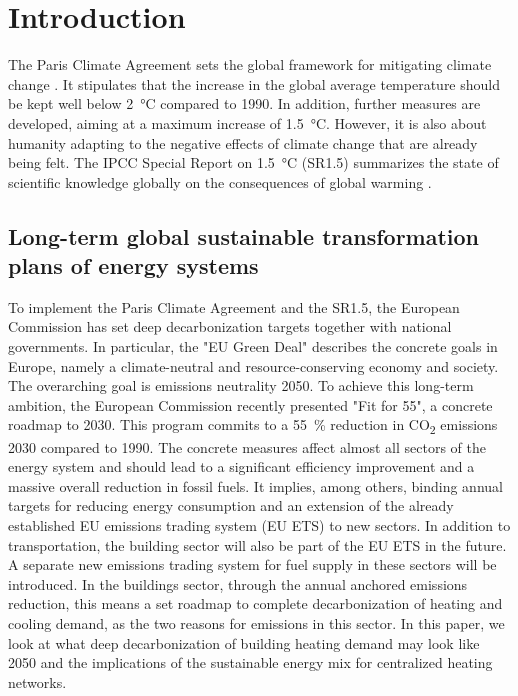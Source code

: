 \section{Introduction}
The Paris Climate Agreement sets the global framework for mitigating climate change \cite{agreement2015paris}. It stipulates that the increase in the global average temperature should be kept well below \SI{2}{\degreeCelsius} compared to 1990. In addition, further measures are developed, aiming at a maximum increase of \SI{1.5}{\degreeCelsius}. However, it is also about humanity adapting to the negative effects of climate change that are already being felt. The IPCC Special Report on \SI{1.5}{\degreeCelsius} (SR1.5) summarizes the state of scientific knowledge globally on the consequences of global warming \cite{edenhofer2011ipcc}.

\subsection{Long-term global sustainable transformation plans of energy systems}
To implement the Paris Climate Agreement and the SR1.5, the European Commission has set deep decarbonization targets together with national governments. In particular, the "EU Green Deal" describes the concrete goals in Europe, namely a climate-neutral and resource-conserving economy and society. The overarching goal is emissions neutrality 2050. To achieve this long-term ambition, the European Commission recently presented "Fit for 55", a concrete roadmap to 2030. This program commits to a \SI{55}{\%} reduction in CO\textsubscript{2} emissions 2030 compared to 1990. The concrete measures affect almost all sectors of the energy system and should lead to a significant efficiency improvement and a massive overall reduction in fossil fuels. It implies, among others, binding annual targets for reducing energy consumption and an extension of the already established EU emissions trading system (EU ETS) to new sectors. In addition to transportation, the building sector will also be part of the EU ETS in the future. A separate new emissions trading system for fuel supply in these sectors will be introduced. In the buildings sector, through the annual anchored emissions reduction, this means a set roadmap to complete decarbonization of heating and cooling demand, as the two reasons for emissions in this sector. In this paper, we look at what deep decarbonization of building heating demand may look like 2050 and the implications of the sustainable energy mix for centralized heating networks.

